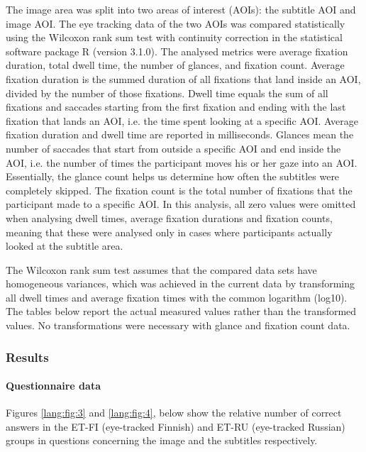 \documentclass[output=paper]{langsci/langscibook}
\begin{document}
The image area was split into two areas of interest (AOIs): the subtitle AOI and image AOI. The eye tracking data of the two AOIs was compared statistically using the Wilcoxon rank sum test with continuity correction in the statistical software package R (version 3.1.0). The analysed metrics were average fixation duration, total dwell time, the number of glances, and fixation count. Average fixation duration is the summed duration of all fixations that land inside an AOI, divided by the number of those fixations. Dwell time equals the sum of all fixations and saccades starting from the first fixation and ending with the last fixation that lands an AOI, i.e. the time spent looking at a specific AOI. Average fixation duration and dwell time are reported in milliseconds. Glances mean the number of saccades that start from outside a specific AOI and end inside the AOI, i.e. the number of times the participant moves his or her gaze into an AOI. Essentially, the glance count helps us determine how often the subtitles were completely skipped. The fixation count is the total number of fixations that the participant made to a specific AOI. In this analysis, all zero values were omitted when analysing dwell times, average fixation durations and fixation counts, meaning that these were analysed only in cases where participants actually looked at the subtitle area.

The Wilcoxon rank sum test assumes that the compared data sets have homogeneous variances, which was achieved in the current data by transforming all dwell times and average fixation times with the common logarithm (log10). The tables below report the actual measured values rather than the transformed values. No transformations were necessary with glance and fixation count data.

\subsubsection{Results}

\paragraph{Questionnaire data}


Figures \ref{lang:fig:3} and \ref{lang:fig:4}, below show the relative number of correct answers in the ET-FI (eye-tracked Finnish) and ET-RU (eye-tracked Russian) groups in questions concerning the image and the subtitles respectively.
\end{document}
